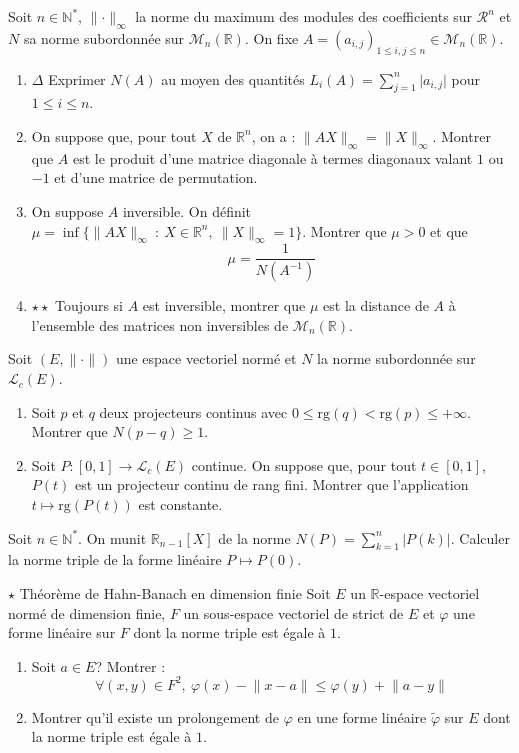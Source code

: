 \documentclass[french,a4paper]{article}
\newcommand{\N}{\mathbb{N}}
\newcommand{\R}{\mathbb{R}}
\newcommand{\st}{^*}
\newcommand{\inv}{^{-1}}
\theoremstyle{plain}
\theoremstyle{definition}
\theoremstyle{remark}
\begin{document}
\begin{ex}[Moulin.35]{}
	Soit $n\in\N\st$, $\lVert\cdot\rVert_\infty$ la norme du maximum des modules des coefficients sur $\mathcal{R}^n$ et $N$ sa norme subordonnée sur $\mathcal{M}_n(\R)$. On fixe $A=(a_{i,j})_{1\leqslant i,j\leqslant n}\in\mathcal{M}_n(\R)$.
	\begin{enumerate}
		\item $\Delta$ Exprimer $N(A)$ au moyen des quantités $L_i(A)=\displaystyle\sum_{j=1}^{n}\lvert a_{i,j}\rvert$ pour $1\leqslant i\leqslant n$.
		\item On suppose que, pour tout $X$ de $\R^n$, on a : $\lVert AX\rVert_\infty=\lVert X\rVert_\infty$. Montrer que $A$ est le produit d'une matrice diagonale à termes diagonaux valant $1$ ou $-1$ et d'une matrice de permutation.
		\item On suppose $A$ inversible. On définit $\mu=\inf\{\lVert AX\rVert_\infty\ : \ X\in\R^n,\ \lVert X\rVert_\infty=1\}$. Montrer que $\mu>0$ et que $$\mu=\frac{1}{N(A\inv)}$$
		\item $\star\star$ Toujours si $A$ est inversible, montrer que $\mu$ est la distance de $A$ à l'ensemble des matrices non inversibles de $\mathcal{M}_n(\R)$.
	\end{enumerate}
\end{ex}

\begin{ex}[Moulin.36]{}
	Soit $(E,\lVert\cdot\rVert)$ une espace vectoriel normé et $N$ la norme subordonnée sur $\mathcal{L}_c(E)$.
	\begin{enumerate}
		\item Soit $p$ et $q$ deux projecteurs continus avec $0\leqslant\text{rg}(q)<\text{rg}(p)\leqslant+\infty$. Montrer que $N(p-q)\geqslant 1$.
		\item Soit $P:[0,1]\to\mathcal{L}_c(E)$ continue. On suppose que, pour tout $t\in[0,1]$, $P(t)$ est un projecteur continu de rang fini. Montrer que l'application $t\mapsto\text{rg}(P(t))$ est constante.
	\end{enumerate}
\end{ex}

\begin{ex}[Moulin.37]{}
	Soit $n\in\N\st$. On munit $\R_{n-1}[X]$ de la norme $N(P)=\displaystyle\sum_{k=1}^{n}\lvert P(k)\rvert$. Calculer la norme triple de la forme linéaire $P\mapsto P(0)$.
\end{ex}

\begin{ex}[Moulin.38]{$\star$ Théorème de Hahn-Banach en dimension finie}
	Soit $E$ un $\R$-espace vectoriel normé de dimension finie, $F$ un sous-espace vectoriel de strict de $E$ et $\varphi$ une forme linéaire sur $F$ dont la norme triple est égale à $1$.
	\begin{enumerate}
		\item Soit $a\in E$? Montrer : $$\forall (x,y)\in F^2,\ \varphi(x)-\lVert x-a\rVert\leqslant\varphi(y)+\lVert a-y\rVert$$
		\item Montrer qu'il existe un prolongement de $\varphi$ en une forme linéaire $\tilde{\varphi}$ sur $E$ dont la norme triple est égale à $1$.
	\end{enumerate}
\end{ex}
\end{document}
